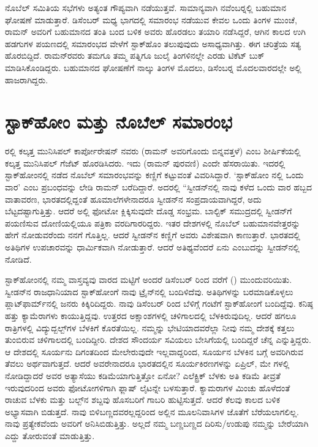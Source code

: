 \newpage

ನೊಬೆಲ್ ಸಮಿತಿಯ ಸಭೆಗಳು ಅತ್ಯಂತ ಗೌಪ್ಯವಾಗಿ ನಡೆಯುತ್ತವೆ. ಸಾಮಾನ್ಯವಾಗಿ ನವೆಂಬರ್‍ನಲ್ಲಿ ಬಹುಮಾನ ಘೋಷಣೆ ಮಾಡುತ್ತಾರೆ. ಡಿಸೆಂಬರ್ ಮಧ್ಯ ಭಾಗದಲ್ಲಿ ಸಮಾರಂಭ ನಡೆಯುವ ಕೇವಲ ಒಂದು ತಿಂಗಳ ಮುಂಚೆ, ರಾಮನ್ ಅವರಿಗೆ ಬಹುಮಾನದ ತಂತಿ ಬಂದ ಬಳಿಕ ಅವರು ಹೊರಡಲು ತಯಾರಿ ನಡೆಸಿದ್ದರೆ, ಆಗಿನ ಕಾಲದ ಉಗಿ ಹಡಗುಗಳ ಪಯಣದಲ್ಲಿ ಸಮಾರಂಭದ ವೇಳೆಗೆ ಸ್ಟಾಕ್‍ಹೊಂ ತಲುಪುವುದು ಅಸಾಧ್ಯವಾಗಿತ್ತು. ಈಗ ಚರಿತ್ರೆಯ ಸತ್ಯ ಹೊರಬಿದ್ದಿದೆ. ರಾಮನ್‍ರವರು ತಮಗೂ ತಮ್ಮ ಪತ್ನಿಗೂ ಜುಲೈ ತಿಂಗಳಿನಲ್ಲೇ ಎರಡು ಟಿಕೆಟ್ ಬುಕ್ ಮಾಡಿಸಿಕೊಂಡಿದ್ದರು. ಬಹುಮಾನದ ಘೋಷಣೆಗೆ ನಾಲ್ಕು ತಿಂಗಳ ಮೊದಲು, ಡಿಸೆಂಬರ್‍ನ ಮೊದಲವಾರದಲ್ಲೇ ಅಲ್ಲಿ ಹಾಜರಾಗಿದ್ದರು.


\section{ಸ್ಟಾಕ್‍ಹೋಂ ಮತ್ತು ನೊಬೆಲ್ ಸಮಾರಂಭ}

ರಲ್ಲಿ ಕಲ್ಕತ್ತ ಮುನಿಸಿಪಲ್ ಕಾರ್ಪೋರೇಷನ್ ನವರು \textit{} (ರಾಮನ್ ಅವರಿಗೊಂದು ಬಿನ್ನವತ್ತಳೆ) ಎಂಬ ಶೀರ್ಷಿಕೆಯಲ್ಲಿ ಕಲ್ಕತ್ತ ಮುನಿಸಿಪಲ್ ಗೆಜೆಟ್ ಹೊರಡಿಸಿದರು. ಇದು  (ರಾಮನ್ ಪುರವಣಿ) ಎಂದೇ ಹೆಸರಾಯಿತು. ಇದರಲ್ಲಿ ಸ್ಟಾಕ್‍ಹೋಂನಲ್ಲಿ ನಡೆದ ನೊಬೆಲ್ ಸಮಾರಂಭವನ್ನು ಕಣ್ಣಿಗೆ ಕಟ್ಟುವಂತೆ ವಿವರಿಸಿದ್ದಾರೆ. ‘ಸ್ಟಾಕ್‍ಹೋಂ ನಲ್ಲಿ ಒಂದು ವಾರ’ ಎಂಬ ಪ್ರಬಂಧವನ್ನು ಲೇಡಿ ರಾಮನ್ ಬರೆದಿದ್ದಾರೆ. ಅದರಲ್ಲಿ\enginline{-} “ಸ್ವೀಡನ್‍ನಲ್ಲಿ ನಾವು ಕಳೆದ ಒಂದು ವಾರ ಹಬ್ಬದ ವಾತಾವರಣ, ಭಾರತದಲ್ಲಿದ್ದಂತೆ ಹೂಮಾಲೆಗಳೇನಾದರೂ ಸ್ವೀಡನ್‍ನ ಸಂಪ್ರದಾಯವಾಗಿದ್ದರೆ, ಅದು ಬೆಟ್ಟದಷ್ಟಾಗುತ್ತಿತ್ತು. ಆದರೆ ಅಲ್ಲಿ ಫೋಟೋ ಕ್ಲಿಕ್ಕಿಸುವುದೇ ದೊಡ್ಡ ಸಂಭ್ರಮ. ಬಾಲ್ಟಿಕ್ ಸಮುದ್ರದಲ್ಲಿ ಸ್ವೀಡನ್‍ಗೆ ಪಯಣಿಸುವ ದೋಣಿಯಲ್ಲಿಯೂ ಪತ್ರಿಕಾ ವರದಿಗಾರರಿದ್ದರು. ಇತರ ದೇಶಗಳಲ್ಲಿ ನೊಬೆಲ್ ಬಹುಮಾನವೇತ್ತರನ್ನು ಹೇಗೆ ನೋಡುವರೆಂದು ನನಗೆ ಗೊತ್ತಿಲ್ಲ. ಆದರೆ ಸ್ವೀಡನ್‍ನ ಕಣ್ಣಿಗೆ ಅವರು ವಿಶೇಷವಾಗಿ ಕಾಣುತ್ತಾರೆ. ಭಾರತದಲ್ಲಿ ಅತಿಥಿಗಳ ಉಪಚಾರವನ್ನು ಧಾರ್ಮಿಕವಾಗಿ ನೋಡುತ್ತಾರೆ. ಆದರೆ ಅತಿಥ್ಯವೆಂದರೆ ಏನು ಎಂಬುದನ್ನು ಸ್ವೀಡನ್‍ನಲ್ಲಿ ನೋಡಿದೆ.

ಸ್ಟಾಕ್‍ಹೋಂನಲ್ಲಿ ನಮ್ಮ ವಾಸ್ತವ್ಯವು ವಾರದ ಮಟ್ಟಿಗೆ ಅಂದರೆ ಡಿಸೆಂಬರ್  ರಿಂದ  ವರೆಗೆ () ಮುಂದುವರಿಯಿತು. ಸ್ವೀಡನ್‍ನ ರಾಜಧಾನಿಯಾದ ಸ್ಟಾಕ್‍ಹೋಂಗೆ ನಾವು ಟ್ರೈನ್‍ನಲ್ಲಿ ಬಂದಿಳಿದೆವು. ಅತಿಥಿಗಳನ್ನು ಬರಮಾಡಿಕೊಳ್ಳಲು ಪ್ಲಾಟ್‍ಫಾರ್ಮ್‌ನಲ್ಲಿ ಜನರು ಕಿಕ್ಕಿರಿದಿದ್ದರು. ನಾವು ಡಿಸೆಂಬರ್  ರಿಂದ ಬೆಳಿಗ್ಗೆ  ಗಂಟೆಗೆ ಸ್ಟಾಕ್‍ಹೋಂಗೆ ಬಂದಿದ್ದೆವು. ಕನಿಷ್ಠ ಹತ್ತು ಕ್ಯಾಮೆರಾಗಳು ಕಾಯುತ್ತಿದ್ದವು. ಉತ್ತರದ ಅಕ್ಷಾಂಶಗಳಲ್ಲಿ ಚಳಿಗಾಲದಲ್ಲಿ ಬೆಳಕಿರುವುದಿಲ್ಲ. ಆದರೆ ಹಗಲೂ ರಾತ್ರಿಗಳಲ್ಲಿ ವಿದ್ಯುದ್ಬಲ್ಬ್‌ಗಳ ಬೆಳಕಿಗೆ ಕೊರತೆಯಿಲ್ಲ. ನಮ್ಮನ್ನು ಭೇಟಿಯಾದವರೆಲ್ಲಾ ನೀವು ನಮ್ಮ ದೇಶಕ್ಕೆ ಕತ್ತಲು ತುಂಬಿರುವ ಚಳಿಗಾಲದಲ್ಲಿ ಬಂದಿದ್ದೀರಿ. ದೇಶದ ಸೌಂದರ್ಯ ಸವಿಯಲು ಬೇಸಿಗೆಯಲ್ಲಿ ಬಂದಿದ್ದರೆ ಚೆನ್ನ ಎನ್ನುತ್ತಿದ್ದರು. ಆ ದೇಶದಲ್ಲಿ ಸೂರ್ಯನು ದಿಗಂತದಿಂದ ಮೇಲೇರುವುದೇ ಇಲ್ಲವಾದ್ದರಿಂದ, ಸೂರ್ಯನ ಬೆಳಕಿನ ಬಗ್ಗೆ ಅವರಿಗಿರುವ ತೆವಲು ಅರ್ಥವಾಗುತ್ತದೆ. ಆದರೆ ಅವರೇನಾದರೂ ಭಾರತದಲ್ಲಿನ ಸೂರ್ಯಕಿರಣಗಳನ್ನು ಏಪ್ರಿಲ್, ಮೇ ಗಳಲ್ಲಿ ನೋಡಿದ್ದಾದರೆ ಅವರ ಅತ್ಯಾಸೆಯು ಕಡಿಮೆಯಾಗುತ್ತಿತ್ತೋ ಏನೋ? ಎಲೆಕ್ಟ್ರಿಕ್ ಬೆಳಕು ಅತಿ ಕಡಿಮೆ ತೀವ್ರತೆ ಇರುವುದರಿಂದ ಅವರು ಫೋಟೋಗಳಿಗಾಗಿ ಫ್ಲಾಷ್ ಲೈಟನ್ನೇ ಬಳಸುತ್ತಾರೆ. ಕ್ಯಾಮರಾಗಳ ಮಿಂಚು ಹೊಳೆದಂತೆ ರಾಚುವ ಬೆಳಕು ಮತ್ತು ಬಲ್ಬ್‌ನ ಶಬ್ದವು ಹೊಸಬರಿಗೆ ಗಾಬರಿ ಹುಟ್ಟಿಸುತ್ತದೆ. ಆದರೆ ಕೆಲವು ಕಾಲದ ಬಳಿಕ ಅಭ್ಯಾಸವಾಗಿ ಬಿಡುತ್ತದೆ. ನಾವು ಬಿಳಿಬಣ್ಣದವರಲ್ಲದ್ದರಿಂದ ಅಲ್ಲಿನ ಮೂಲನಿವಾಸಿಗಳ ಜೊತೆಗೆ ಬೆರೆಯಲಾಗಲಿಲ್ಲ. ನಾವು ಪ್ರತ್ಯೇಕವೆಂದು ಅವರಿಗೆ ಅನಿಸಿಬಿಡುತ್ತಿತ್ತು. ಅಲ್ಲದೆ ನಮ್ಮ ಬಣ್ಣಬಣ್ಣದ ದಿರಿಸು/ಉಡುಪು ನಮ್ಮನ್ನು ಬೇರೆಯಾಗಿ ಎದ್ದು ತೋರುವಂತೆ ಮಾಡುತ್ತಿತ್ತು.

